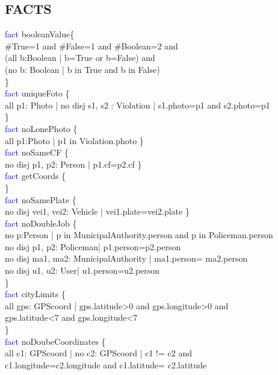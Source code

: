 \subsection{FACTS}
\textcolor{blue}{fact}
\textcolor{mycolor}{booleanValue}\{\\
\#True=1 and \#False=1 and \#Boolean=2 and \\
(all b:Boolean | b=True or b=False) and\\
(no b: Boolean | b in True and b in False)\\
\}\\
\textcolor{blue}{fact}
\textcolor{mycolor}{uniqueFoto} \{\\
all p1: Photo | no disj s1, s2 : Violation | s1.photo=p1 and s2.photo=p1\\
\}\\
\textcolor{blue}{fact}
\textcolor{mycolor}{noLonePhoto} \{\\
all p1:Photo | p1 in Violation.photo
\}\\
\textcolor{blue}{fact}
\textcolor{mycolor}{noSameCF} \{\\
no disj p1, p2: Person | p1.cf=p2.cf
\}\\
\textcolor{blue}{fact}
\textcolor{mycolor}{getCoords} \{\\
\}\\
\textcolor{blue}{fact}
\textcolor{mycolor}{noSamePlate} \{\\
no disj vei1, vei2: Vehicle | vei1.plate=vei2.plate
\}\\
\textcolor{blue}{fact}
\textcolor{mycolor}{noDoubleJob} \{\\
no p:Person | p in MunicipalAuthority.person and p in Policeman.person\\
no disj p1, p2: Policeman| p1.person=p2.person\\
no disj ma1, ma2: MunicipalAuthority | ma1.person= ma2.person\\
no disj u1, u2: User| u1.person=u2.person\\
\}\\
\textcolor{blue}{fact}
\textcolor{mycolor}{cityLimits} \{\\
all gps: GPScoord | gps.latitude>0 and gps.longitude>0 and\\
gps.latitude<7 and gps.longitude<7\\
\}\\
\textcolor{blue}{fact}
\textcolor{mycolor}{noDoubeCoordinates} \{\\
all c1: GPScoord | no c2: GPScoord | c1 != c2 and\\ c1.longitude=c2.longitude and c1.latitude= c2.latitude\\
